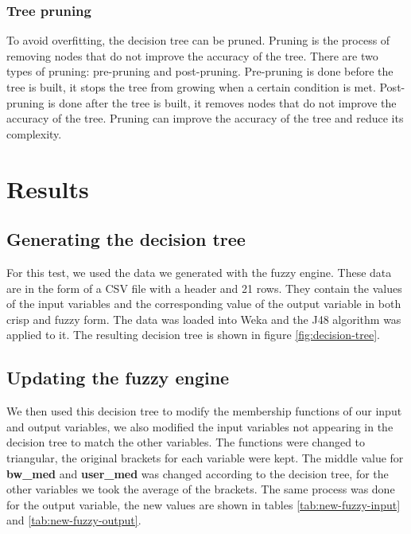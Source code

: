 \subsubsection*{Tree pruning}
\label{subsubsubsec:tree-pruning}

To avoid overfitting, the decision tree can be pruned. Pruning is the process of removing nodes that do not improve the
accuracy of the tree. There are two types of pruning: pre-pruning and post-pruning. Pre-pruning is done before the tree
is built, it stops the tree from growing when a certain condition is met. Post-pruning is done after the tree is built,
it removes nodes that do not improve the accuracy of the tree. Pruning can improve the accuracy of the tree and reduce
its complexity.

\section{Results}
\label{sec:decision-tree-results}

\subsection{Generating the decision tree}
\label{subsec:decision-tree-generation}

For this test, we used the data we generated with the fuzzy engine. These data are in the form of a CSV file with a
header and 21 rows. They contain the values of the input variables and the corresponding value of the output variable
in both crisp and fuzzy form. The data was loaded into Weka and the J48 algorithm was applied to it. The resulting
decision tree is shown in figure \ref{fig:decision-tree}.

\subsection{Updating the fuzzy engine}
\label{subsec:decision-tree-update}

We then used this decision tree to modify the membership functions of our input and output variables, we also modified
the input variables not appearing in the decision tree to match the other variables. The functions were changed to
triangular, the original brackets for each variable were kept. The middle value for \textbf{bw_med} and \textbf{user_med}
was changed according to the decision tree, for the other variables we took the average of the brackets. The same process
was done for the output variable, the new values are shown in tables \ref{tab:new-fuzzy-input} and
\ref{tab:new-fuzzy-output}.

